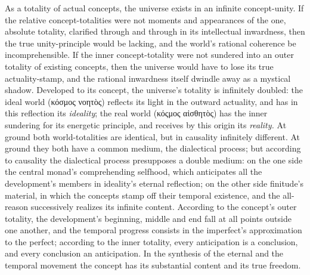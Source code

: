 \documentclass[12pt]{book}
\begin{document}
As a totality of actual concepts, the universe exists in an infinite
concept-unity. If the relative concept-totalities were not moments and
appearances of the one, absolute totality, clarified through and through in
its intellectual inwardness, then the true unity-principle would be lacking,
and the world's rational coherence be incomprehensible. If the inner
concept-totality were not sundered into an outer totality of existing
concepts, then the universe would have to lose its true actuality-stamp, and
the rational inwardness itself dwindle away as a mystical shadow. Developed
to its concept, the universe's totality is infinitely doubled: the ideal
world (κόσμος νοητὸς) reflects its light in the outward actuality, and has
in this reflection its \emph{ideality}; the real world (κόςμος αἰσθητὸς) has
the inner sundering for its energetic principle, and receives by this origin
its \emph{reality.} At ground both world-totalities are identical, but in
causality infinitely different. At ground they both have a common medium,
the dialectical process; but according to causality the dialectical process
presupposes a double medium: on the one side the central monad's
comprehending selfhood, which anticipates all the development's members in
ideality's eternal reflection; on the other side finitude's material, in
which the concepts stamp off their temporal existence, and the all-reason
successively realizes its infinite content. According to the concept's outer
totality, the development's beginning, middle and end fall at all points
outside one another, and the temporal progress consists in the imperfect's
approximation to the perfect; according to the inner totality, every
anticipation is a conclusion, and every conclusion an anticipation. In the
synthesis of the eternal and the temporal movement the concept has its
substantial content and its true freedom.
\end{document}
